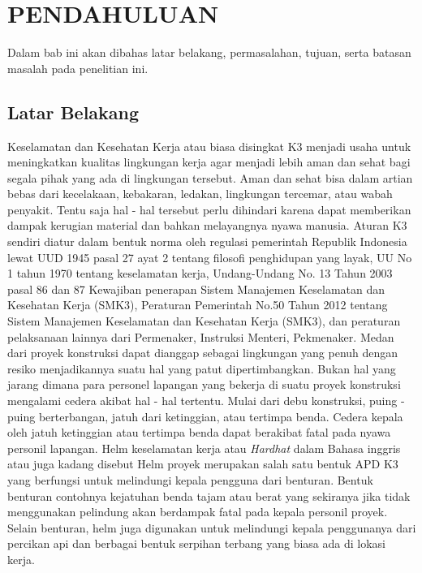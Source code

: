 \chapter{PENDAHULUAN}
\label{chap:pendahuluan}


Dalam bab ini akan dibahas latar belakang, permasalahan, tujuan, serta batasan masalah pada penelitian ini.

\section{Latar Belakang}
\label{sec:latarbelakang}

Keselamatan dan Kesehatan Kerja atau biasa disingkat K3 menjadi usaha untuk meningkatkan kualitas lingkungan kerja agar menjadi lebih aman dan sehat bagi segala pihak yang ada di lingkungan tersebut. Aman dan sehat bisa dalam artian bebas dari kecelakaan, kebakaran, ledakan, lingkungan tercemar, atau wabah penyakit. Tentu saja hal - hal tersebut perlu dihindari karena dapat memberikan dampak kerugian material dan bahkan melayangnya nyawa manusia. Aturan K3 sendiri diatur dalam bentuk norma oleh regulasi pemerintah Republik Indonesia lewat UUD 1945 pasal 27 ayat 2 tentang filosofi penghidupan yang layak, UU No 1 tahun 1970 tentang keselamatan kerja, Undang-Undang No. 13 Tahun 2003 pasal 86 dan 87 Kewajiban penerapan Sistem Manajemen Keselamatan dan Kesehatan Kerja (SMK3), Peraturan Pemerintah No.50 Tahun 2012 tentang Sistem Manajemen Keselamatan dan Kesehatan Kerja (SMK3), dan peraturan pelaksanaan lainnya dari Permenaker, Instruksi Menteri, Pekmenaker.  \cite{ahlik3umum-k3indonesia_2021}
Medan dari proyek konstruksi dapat dianggap sebagai lingkungan yang penuh dengan resiko menjadikannya suatu hal yang patut dipertimbangkan. Bukan hal yang jarang dimana para personel lapangan yang bekerja di suatu proyek konstruksi mengalami cedera akibat hal - hal tertentu. Mulai dari debu konstruksi, puing - puing berterbangan, jatuh dari ketinggian, atau tertimpa benda. Cedera kepala oleh jatuh ketinggian atau tertimpa benda dapat berakibat fatal pada nyawa personil lapangan. \cite{li2020deep}
Helm keselamatan kerja atau \emph{Hardhat} dalam Bahasa inggris atau juga kadang disebut Helm proyek merupakan salah satu bentuk APD K3 yang berfungsi untuk melindungi kepala pengguna dari benturan. Bentuk benturan contohnya kejatuhan benda tajam atau berat yang sekiranya jika tidak menggunakan pelindung akan berdampak fatal pada kepala personil proyek. Selain benturan, helm juga digunakan untuk melindungi kepala penggunanya dari percikan api dan berbagai bentuk serpihan terbang yang biasa ada di lokasi kerja.\cite{k3_mutiaramutu}
